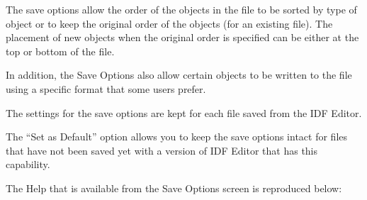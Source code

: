 The save options allow the order of the objects in the file to be sorted by type of object or to keep the original order of the objects (for an existing file). The placement of new objects when the original order is specified can be either at the top or bottom of the file.

In addition, the Save Options also allow certain objects to be written to the file using a specific format that some users prefer.

The settings for the save options are kept for each file saved from the IDF Editor.

The ``Set as Default'' option allows you to keep the save options intact for files that have not been saved yet with a version of IDF Editor that has this capability.

The Help that is available from the Save Options screen is reproduced below:

